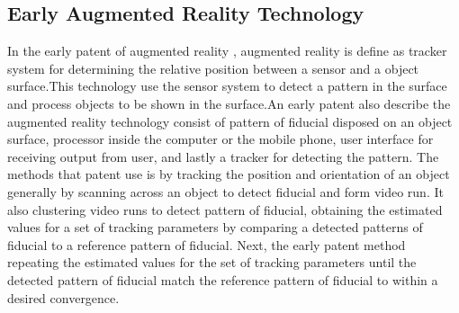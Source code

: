 \documentclass[12pt]{article}
\begin{document}
\subsection{Early Augmented Reality Technology}
In the early patent of augmented reality  \cite{meisner2007augmented}, augmented reality is define as tracker system for determining the relative position between a sensor and a object surface.This technology use the sensor system to detect a pattern in the surface and process objects to be shown in the surface.An early patent also describe the augmented reality technology consist of pattern of fiducial disposed on an object surface, processor inside the computer or the mobile phone, user interface for receiving output from user, and lastly a tracker for detecting the pattern. The methods that patent use is by tracking the position and orientation of an object generally by scanning across an object to detect fiducial and form video run. It also clustering video runs to detect pattern of fiducial, obtaining the estimated values for a set of tracking parameters by comparing a detected patterns of fiducial to a reference pattern of fiducial. Next, the early patent method repeating the estimated values for the set of tracking parameters until the detected pattern of fiducial match the reference pattern of fiducial to within a desired convergence.
\end{document}
